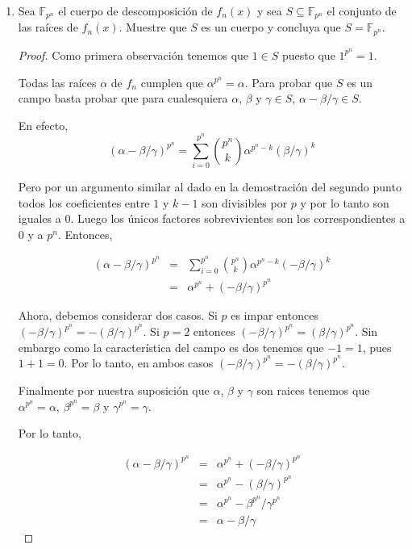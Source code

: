 \documentclass[letter,twoside,12pt]{article}
\begin{document}
\begin{enumerate}
\begin{enumerate}
\item Sea $ \mathbb{F}_{p^n} $ el cuerpo de descomposición de $ f_n(x) $ y sea $ S \subseteq \mathbb{F}_{p^n} $ el conjunto de las raíces de $ f_n(x) $.
Muestre que $ S $ es un cuerpo y concluya que $ S = \mathbb{F}_{p^n} $.
\begin{proof}

Como primera observación tenemos que $ 1 \in S $ puesto que $ 1^{p^n}=1 $.

Todas las raíces $ \alpha $ de $ f_n $ cumplen que $ \alpha^{p^n}=\alpha $. Para probar que $ S $ es un campo basta probar que para cualesquiera $ \alpha $, $ \beta $ y $ \gamma \in S $, $ \alpha-\beta/\gamma \in S $.

En efecto,  
\begin{equation}
(\alpha-\beta/\gamma)^{p^n} = \sum_{i = 0}^{p^n}\binom{p^n}{k}\alpha^{p^n-k}(\beta/\gamma)^{k}
\end{equation}

Pero por un argumento similar al dado en la demostración del segundo punto todos los coeficientes entre $ 1 $ y $ k-1 $ son divisibles por $ p $ y por lo tanto son iguales a 0. Luego los únicos factores sobrevivientes son los correspondientes a $ 0 $ y a $ p^n $.
Entonces,

\begin{eqnarray}
(\alpha-\beta/\gamma)^{p^n} &=& \sum_{i = 0}^{p^n}\binom{p^n}{k}\alpha^{p^n-k}(-\beta/\gamma)^{k} \nonumber
\\ &=& \alpha^{p^n}+(-\beta/\gamma)^{p^n} \nonumber
\end{eqnarray}

Ahora, debemos considerar dos casos. Si $ p $ es impar entonces $ (-\beta/\gamma)^{p^n} = -(\beta/\gamma)^{p^n}$.
Si $ p = 2 $ entonces $ (-\beta/\gamma)^{p^n} = (\beta/\gamma)^{p^n}$. Sin embargo como la característica del campo es dos tenemos que $ -1 = 1 $, pues $ 1+1 =0 $. Por lo tanto, en ambos casos $ (-\beta/\gamma)^{p^n} = -(\beta/\gamma)^{p^n}$.

Finalmente por nuestra suposición que $ \alpha $, $ \beta $ y $ \gamma $ son raices tenemos que $ \alpha^{p^n}=\alpha $, $ \beta^{p^n}=\beta $ y $ \gamma^{p^n}=\gamma $.

Por lo tanto,

\begin{eqnarray}
(\alpha-\beta/\gamma)^{p^n} &=& \alpha^{p^n}+(-\beta/\gamma)^{p^n} \nonumber
\\&=& \alpha^{p^n}-(\beta/\gamma)^{p^n} \nonumber
\\&=& \alpha^{p^n}-\beta^{p^n}/\gamma^{p^n} \nonumber
\\&=& \alpha-\beta/\gamma \nonumber
\end{eqnarray}


\end{proof}
\end{enumerate}
\end{enumerate}
\end{document}
